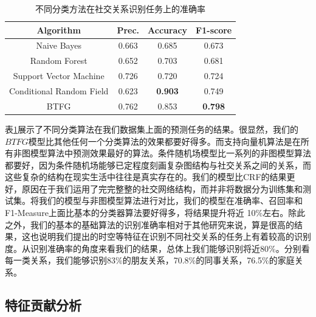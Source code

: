 \begin{table}
\centering
\caption{不同分类方法在社交关系识别任务上的准确率}
\label{method-results}

\begin{tabular}{|c|c|c|c|}
	\hline
Algorithm & Prec. & Accuracy  & F1-score\\ \hline
Naive Bayes &0.663 & 0.685 & 0.673 \\ \hline
Random Forest& 0.652 & 0.703& 0.681 \\ \hline
Support Vector Machine & 0.726 & 0.720 & 0.724\\ \hline
Conditional Random Field & 0.623 & \textbf{0.903} & 0.749 \\ \hline
BTFG & 0.762 & 0.853 & \textbf{0.798} \\ \hline
\end{tabular}
\end{table}

表\ref{method-results}展示了不同分类算法在我们数据集上面的预测任务的结果。很显然，我们的$BTFG$模型比其他任何一个分类算法的效果都要好得多。而支持向量机算法是在所有非图模型算法中预测效果最好的算法。条件随机场模型比一系列的非图模型算法都要好，因为条件随机场能够已定程度刻画复杂图结构与社交关系之间的关系，而这些复杂的结构在现实生活中往往是真实存在的。我们的模型比CRF的结果更好，原因在于我们运用了完完整整的社交网络结构，而并非将数据分为训练集和测试集。将我们的模型与非图模型算法进行对比，我们的模型在准确率、召回率和F1-Measure上面比基本的分类器算法要好得多，将结果提升将近 10\%左右。除此之外，我们的基本的基础算法的识别准确率相对于其他研究来说，算是很高的结果，这也说明我们提出的时空等特征在识别不同社交关系的任务上有着较高的识别度。从识别准确率的角度来看我们的结果，总体上我们能够识别将近80\%。分别看每一类关系，我们能够识别83\%的朋友关系，70.8\%的同事关系，76.5\%的家庭关系。


\subsection{特征贡献分析}


